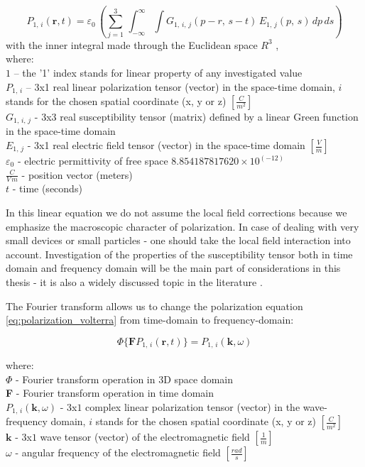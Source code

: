 \documentclass[12pt,twoside,a4paper]{article}
\numberwithin{equation}{subsection}
\numberwithin{figure}{subsection}
\begin{document}
\begin{equation} \label{eq:polarization_volterra}
  {P_{1, \,i}} (\textbf{r}, t) = {\varepsilon_{0}}\, \left(  \! \sum_{j=1}^{3}\,\int_{ -
  \infty }^{\infty }\int {G_{1, \,i, \,j}}(p - r, \,s - t)\,{E_{1,\,j}}(p, \,s)\,dp\,ds \!  \right)
\end{equation}
with the inner integral made through the Euclidean space $R^{3}$ \cite{thesis_novak},\\
where: \\
${1}$ -- the '1' index stands for linear property of any investigated value \\
${P_{1, \,i}}$ -- 3x1 real linear polarization tensor (vector) in the space-time domain, $i$ stands for the chosen spatial
coordinate (x, y or z) $[\frac {C}{m^{2}}]$ \\
${G_{1, \,i, \,j}}$ - 3x3 real susceptibility tensor (matrix) defined by a linear Green function in the space-time domain
\cite{fakiszscan} \\ ${E_{1, \,j}}$ - 3x1 real electric field tensor (vector) in the space-time domain $[\frac {V}{m}]$ \\
${\varepsilon_{0}}$ - electric permittivity of free space $8.854187817620 \times 10^{( - 12)}$ \\
$\frac {C}{V\,m}$  -  position vector (meters)  \\
$t$ - time (seconds)

In this linear equation we do not assume the local field corrections \cite{chui_lf_correction} because we emphasize the macroscopic
character of polarization. In case of dealing with very small devices or small particles - one should take the local
field interaction into account. Investigation of the properties of the susceptibility tensor both in time domain and frequency
domain will be the main part of considerations in this thesis - it is also a widely discussed topic in the literature
\cite{boyd_nlo, prasad_intro_nlo, Levenson_dispersion, trager_springer, bloembergen_nonlinear}.

The Fourier transform allows us to change the polarization equation \ref{eq:polarization_volterra} from time-domain to frequency-domain:

\begin{equation} \label{eq:polarization_frequency}
   \Phi \{ \textbf{F} P_{1, \, i} ( \textbf{r}, t) \} = P_{1, \, i} (\textbf{k}, \omega )
\end{equation}

where: \\
$\Phi $ - Fourier transform operation in $3$D space domain \\
\textbf{F} - Fourier transform operation in time domain \\
${P_{1, \,i}} (\textbf{k},\omega )$ - $3$x$1$ complex linear polarization tensor (vector) in the wave-frequency domain, 
$i$ stands for the chosen spatial coordinate (x, y or z) $[\frac {C}{m^{2}}]$ \\
$\textbf{k}$ - $3$x$1$ wave tensor (vector) of the electromagnetic field $[\frac {1}{m}]$ \\
$\omega $ - angular frequency of the electromagnetic field $[\frac {rad}{s}]$
\end{document}
